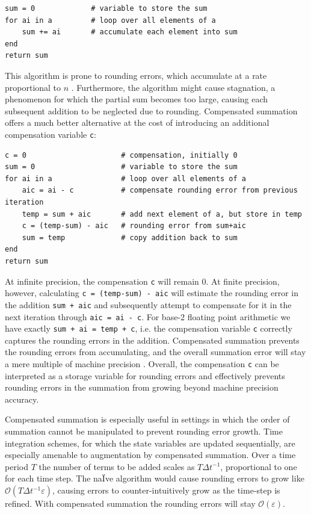 \begin{lstlisting}[language=JuliaLocal]
sum = 0             # variable to store the sum
for ai in a         # loop over all elements of a
	sum += ai       # accumulate each element into sum   
end
return sum
\end{lstlisting}

This algorithm is prone to rounding errors, which accumulate at a rate proportional to $n$ \citep{Higham1993}.
Furthermore, the algorithm might cause stagnation, a phenomenon for which the partial sum becomes too large,
causing each subsequent addition to be neglected due to rounding. Compensated summation offers a much
better alternative at the cost of introducing an additional compensation variable \texttt{c}:

\begin{lstlisting}[language=JuliaLocal]
c = 0                      # compensation, initially 0
sum = 0                    # variable to store the sum
for ai in a                # loop over all elements of a
	aic = ai - c           # compensate rounding error from previous iteration
 	temp = sum + aic       # add next element of a, but store in temp
	c = (temp-sum) - aic   # rounding error from sum+aic
 	sum = temp             # copy addition back to sum
end
return sum
\end{lstlisting}

At infinite precision, the compensation \texttt{c} will remain 0. At finite precision, however, calculating \texttt{c = (temp-sum) - aic}
will estimate the rounding error in the addition \texttt{sum + aic} and subsequently attempt to compensate for it in the next iteration
through \texttt{aic = ai - c}. For base-2 floating point arithmetic we have exactly \texttt{sum + ai = temp + c}, i.e. the compensation
variable \texttt{c} correctly captures the rounding errors in the addition. Compensated summation prevents the rounding errors
from accumulating, and the overall summation error will stay a mere multiple of machine precision \citep{Higham1993}. Overall,
the compensation \texttt{c} can be interpreted as a storage variable for rounding errors and effectively prevents rounding errors
in the summation from growing beyond machine precision accuracy.

Compensated summation is especially useful in settings in which the order of summation cannot be manipulated to prevent
rounding error growth. Time integration schemes, for which the state variables are updated sequentially, are especially
amenable to augmentation by compensated summation. Over a time period $T$ the number of terms to be added scales
as $T\Delta t^{-1}$, proportional to one for each time step. The naÏve algorithm would cause rounding errors to grow like
$\mathcal{O}(T\Delta t^{-1}\varepsilon)$, causing errors to counter-intuitively grow as the time-step is refined.
With compensated summation the rounding errors will stay $\mathcal{O}(\varepsilon)$.

